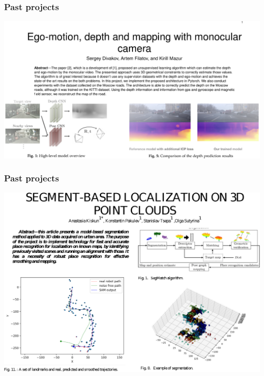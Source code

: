\documentclass[xetex,mathserif,serif]{beamer} %
\begin{document}
\begin{frame}
\frametitle{Past projects}

\begin{center}
\includegraphics[width=.95\textwidth]{g2}
\end{center}

\end{frame}

\begin{frame}
\frametitle{Past projects}

\begin{center}
\includegraphics[width=.95\textwidth]{g3}
\end{center}

\end{frame}



\end{document}

